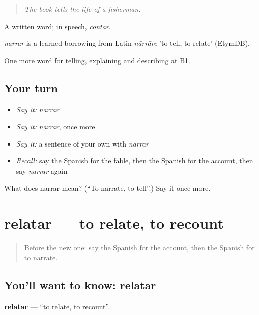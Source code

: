\begin{quote}
\emph{The book tells the life of a fisherman.}
\end{quote}

A written word; in speech, \emph{contar}.

\begin{cousinweb}
\emph{narrar} is a learned borrowing from Latin \emph{nārrāre} 'to tell, to relate' (EtymDB).
\end{cousinweb}

\begin{grammarlens}[title={What you've built}]
One more word for telling, explaining and describing at B1.
\end{grammarlens}

\subsection*{Your turn}
\begin{itemize}
\raggedright
  \item \emph{Say it:} \emph{narrar}
  \item \emph{Say it:} \emph{narrar}, once more
  \item \emph{Say it:} a sentence of your own with \emph{narrar}
  \item \emph{Recall:} say the Spanish for the fable, then the Spanish for the account, then say \emph{narrar} again
\end{itemize}

\begin{tcolorbox}[breakable,colback=teal!4,colframe=teal!35!black,title={Before you move on}]
What does narrar mean? (\textquotedblleft{}To narrate, to tell\textquotedblright{}.) Say it once more.
\end{tcolorbox}
\section[relatar]{relatar — to relate, to recount}

\label{lesson:ES-C563-relatar}



\begin{quote}
Before the new one: say the Spanish for the account, then the Spanish for to narrate.
\end{quote}

\subsection*{You'll want to know: relatar}
\textbf{relatar} — \textquotedblleft{}to relate, to recount\textquotedblright{}.


